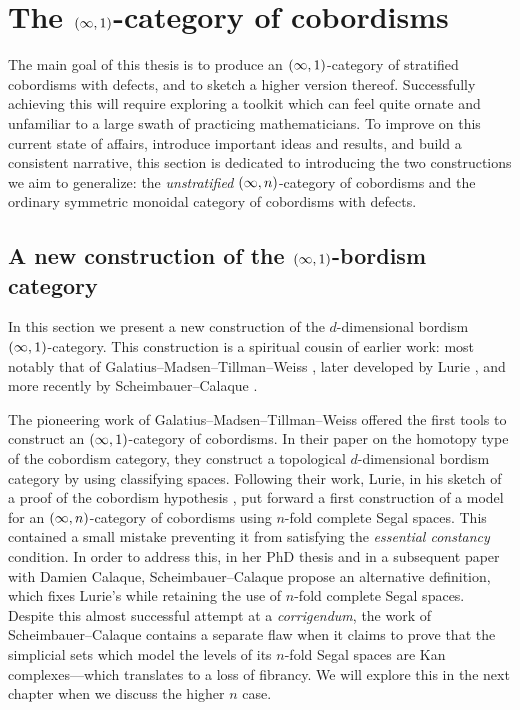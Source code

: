 

\chapter{The \texorpdfstring{$(\operatorname{\infty},1)$} --category of cobordisms}


The main goal of this thesis is to produce an $(\operatorname{\infty},1)$-category of stratified cobordisms with defects, and to sketch a higher version thereof. Successfully achieving this will require exploring a toolkit which can feel quite ornate and unfamiliar to a large swath of practicing mathematicians. To improve on this current state of affairs, introduce important ideas and results, and build a consistent narrative, this section is dedicated to introducing the two constructions we aim to generalize: the \emph{unstratified} $(\operatorname{\infty},n)$-category of cobordisms and the ordinary symmetric monoidal category of cobordisms with defects. 

\medskip

\section{A new construction of the \texorpdfstring{$(\operatorname{\infty},1)$}{(infty,1)}-bordism category}


In this section we present a new construction of the $d$-dimensional bordism
$(\operatorname{\infty},1)$-category. This construction is a spiritual cousin of earlier work:
most notably that of Galatius--Madsen--Tillman--Weiss \cite{GMTW09}, later
developed by Lurie \cite{Lur09}, and more recently by Scheimbauer--Calaque
\cite{CS19}. 

The pioneering work of Galatius--Madsen--Tillman--Weiss offered the first tools to construct an $(\operatorname{\infty},1)$-category of cobordisms. In their paper on the homotopy type of the cobordism category, they construct a topological $d$-dimensional bordism category by using classifying spaces. Following their work, Lurie, in his sketch of a proof of the cobordism hypothesis \cite{Lur09}, put forward a first construction of a model for an $(\operatorname{\infty},n)$-category of cobordisms using $n$-fold complete Segal spaces. This contained a small mistake preventing it from satisfying the \emph{essential constancy} condition. In order to address this, in her PhD thesis and in a subsequent paper with Damien Calaque, Scheimbauer--Calaque propose an alternative definition, which fixes Lurie's while retaining the use of $n$-fold complete Segal spaces. Despite this almost successful attempt at a \emph{corrigendum}, the work of Scheimbauer--Calaque contains a separate flaw when it claims to prove that the simplicial sets which model the levels of its $n$-fold Segal spaces are Kan complexes---which translates to a loss of fibrancy. We will explore this in the next chapter when we discuss the higher $n$ case.

